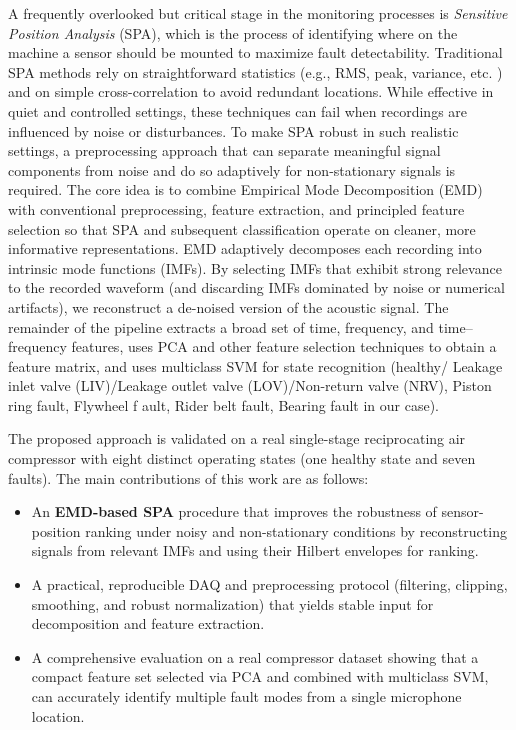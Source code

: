 \documentclass[12pt,a4paper]{article}
\begin{document}
\begin{multicols}{2}
A frequently overlooked but critical stage in the monitoring processes is \emph{Sensitive Position Analysis} (SPA), which is the process of identifying where on the machine a sensor should be mounted to maximize fault detectability. Traditional SPA methods rely on straightforward statistics (e.g., RMS, peak, variance, etc. ) and on simple cross-correlation to avoid redundant locations. While effective in quiet and controlled settings, these techniques can fail when recordings are influenced by noise or disturbances. To make SPA robust in such realistic settings, a preprocessing approach that can separate meaningful signal components from noise and do so adaptively for non-stationary signals is required. The core idea is to combine Empirical Mode Decomposition (EMD) with conventional preprocessing, feature extraction, and principled feature selection so that SPA and subsequent classification operate on cleaner, more informative representations. EMD adaptively decomposes each recording into intrinsic mode functions (IMFs). By selecting IMFs that exhibit strong relevance to the recorded waveform (and discarding IMFs dominated by noise or numerical artifacts), we reconstruct a de-noised version of the acoustic signal. The remainder of the pipeline extracts a broad set of time, frequency, and time–frequency features, uses PCA and other feature selection techniques to obtain a feature matrix, and uses multiclass SVM for state recognition (healthy/ Leakage inlet valve (LIV)/Leakage outlet valve (LOV)/Non-return valve (NRV), Piston ring fault, Flywheel f ault, Rider belt fault, Bearing fault in our case).

The proposed approach is validated on a real single-stage reciprocating air compressor with eight distinct operating states (one healthy state and seven faults).
The main contributions of this work are as follows:
\begin{itemize}
  \item An \textbf{EMD-based SPA} procedure that improves the robustness of sensor-position ranking under noisy and non-stationary conditions by reconstructing signals from relevant IMFs and using their Hilbert envelopes for ranking.
  \item A practical, reproducible DAQ and preprocessing protocol (filtering, clipping, smoothing, and robust normalization) that yields stable input for decomposition and feature extraction.
  \item A comprehensive evaluation on a real compressor dataset showing that a compact feature set selected via PCA and combined with multiclass SVM, can accurately identify multiple fault modes from a single microphone location.
\end{itemize}
\end{multicols}
\end{document}
